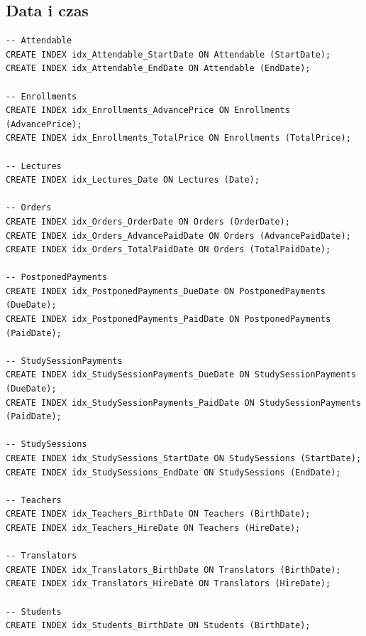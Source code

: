 \documentclass[11pt,a4paper]{article}
\begin{document}
\subsection{Data i czas}
\begin{Verbatim}[breaklines=true]
-- Attendable
CREATE INDEX idx_Attendable_StartDate ON Attendable (StartDate);
CREATE INDEX idx_Attendable_EndDate ON Attendable (EndDate);

-- Enrollments
CREATE INDEX idx_Enrollments_AdvancePrice ON Enrollments (AdvancePrice);
CREATE INDEX idx_Enrollments_TotalPrice ON Enrollments (TotalPrice);

-- Lectures
CREATE INDEX idx_Lectures_Date ON Lectures (Date);

-- Orders
CREATE INDEX idx_Orders_OrderDate ON Orders (OrderDate);
CREATE INDEX idx_Orders_AdvancePaidDate ON Orders (AdvancePaidDate);
CREATE INDEX idx_Orders_TotalPaidDate ON Orders (TotalPaidDate);

-- PostponedPayments
CREATE INDEX idx_PostponedPayments_DueDate ON PostponedPayments (DueDate);
CREATE INDEX idx_PostponedPayments_PaidDate ON PostponedPayments (PaidDate);

-- StudySessionPayments
CREATE INDEX idx_StudySessionPayments_DueDate ON StudySessionPayments (DueDate);
CREATE INDEX idx_StudySessionPayments_PaidDate ON StudySessionPayments (PaidDate);

-- StudySessions
CREATE INDEX idx_StudySessions_StartDate ON StudySessions (StartDate);
CREATE INDEX idx_StudySessions_EndDate ON StudySessions (EndDate);

-- Teachers
CREATE INDEX idx_Teachers_BirthDate ON Teachers (BirthDate);
CREATE INDEX idx_Teachers_HireDate ON Teachers (HireDate);

-- Translators
CREATE INDEX idx_Translators_BirthDate ON Translators (BirthDate);
CREATE INDEX idx_Translators_HireDate ON Translators (HireDate);

-- Students
CREATE INDEX idx_Students_BirthDate ON Students (BirthDate);
\end{Verbatim}
\end{document}
